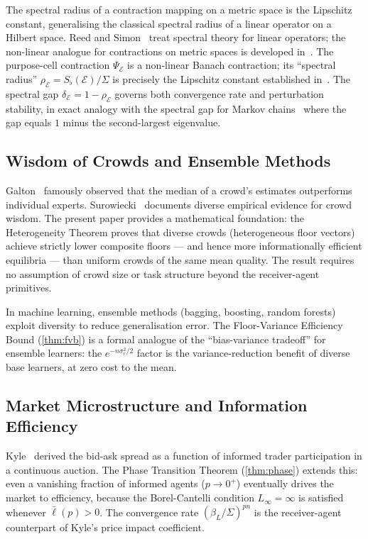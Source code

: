 \documentclass[twocolumn,11pt,a4paper]{article}
\theoremstyle{remark}
\newcommand{\Sflat}{S_{\flat}}
\newcommand{\Ens}{\mathcal{E}}
\newcommand{\srad}{\rho}                  %
\newcommand{\sgap}{\delta}                %
\newcommand{\logfl}{\ell}                 %
\newcommand{\Logfl}{L}                    %
\newcommand{\CV}{\sigma_r}               %
\begin{document}
The spectral radius of a contraction mapping on a metric space is the
Lipschitz constant, generalising the classical spectral radius of a linear
operator on a Hilbert space.  Reed and Simon~\cite{reedsimon1972} treat
spectral theory for linear operators; the non-linear analogue for contractions
on metric spaces is developed in~\cite{banach1922}.  The purpose-cell
contraction $\Psi_\Ens$ is a non-linear Banach contraction; its
``spectral radius'' $\srad_\Ens = \Sflat(\Ens)/\Sigma$ is precisely the
Lipschitz constant established in~\cite{sachikonye2025market}.  The spectral
gap $\sgap_\Ens = 1-\srad_\Ens$ governs both convergence rate and
perturbation stability, in exact analogy with the spectral gap for Markov
chains~\cite{levin2009} where the gap equals $1$ minus the second-largest
eigenvalue.

\subsection{Wisdom of Crowds and Ensemble Methods}
\label{sec:lit:crowds}

Galton~\cite{galton1907} famously observed that the median of a crowd's
estimates outperforms individual experts.  Surowiecki~\cite{surowiecki2004}
documents diverse empirical evidence for crowd wisdom.  The present paper
provides a mathematical foundation: the Heterogeneity Theorem proves that
diverse crowds (heterogeneous floor vectors) achieve strictly lower composite
floors — and hence more informationally efficient equilibria — than uniform
crowds of the same mean quality.  The result requires no assumption of crowd
size or task structure beyond the receiver-agent primitives.

In machine learning, ensemble methods (bagging, boosting, random forests)
exploit diversity to reduce generalisation error.  The Floor-Variance
Efficiency Bound (\cref{thm:fvb}) is a formal analogue of the ``bias-variance
tradeoff'' for ensemble learners: the $e^{-n\CV^2/2}$ factor is the
variance-reduction benefit of diverse base learners, at zero cost to the mean.

\subsection{Market Microstructure and Information Efficiency}
\label{sec:lit:micro}

Kyle~\cite{kyle1985} derived the bid-ask spread as a function of informed
trader participation in a continuous auction.  The Phase Transition Theorem
(\cref{thm:phase}) extends this: even a vanishing fraction of informed agents
($p\to 0^+$) eventually drives the market to efficiency, because the
Borel-Cantelli condition $\Logfl_\infty = \infty$ is satisfied whenever
$\bar\logfl(p) > 0$.  The convergence rate $(\beta_L/\Sigma)^{pn}$ is the
receiver-agent counterpart of Kyle's price impact coefficient.
\end{document}
